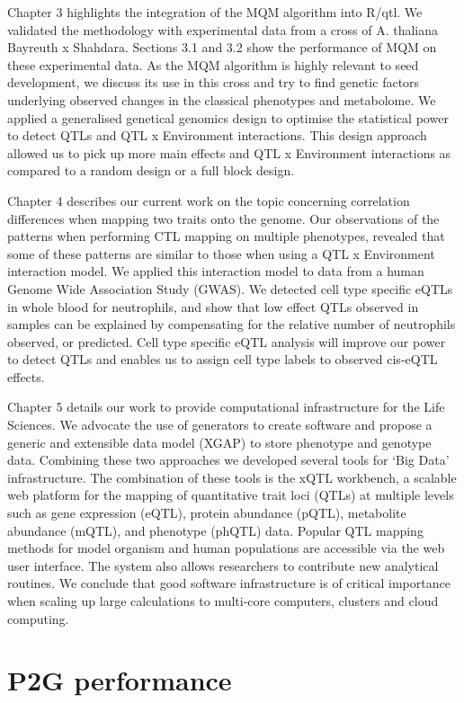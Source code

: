 Chapter 3 highlights the integration of the MQM algorithm into R/qtl. We validated the methodology with experimental data from a 
cross of A. thaliana Bayreuth x Shahdara. Sections 3.1 and 3.2 show the performance of MQM on these experimental data. As the MQM 
algorithm is highly relevant to seed development, we discuss its use in this cross and try to find genetic factors underlying 
observed changes in the classical phenotypes and metabolome. We applied a generalised genetical genomics design to optimise the 
statistical power to detect QTLs and QTL x Environment interactions. This design approach allowed us to pick up more main effects 
and QTL x Environment interactions as compared to a random design or a full block design.

Chapter 4 describes our current work on the topic concerning correlation differences when mapping two traits onto the genome. Our 
observations of the patterns when performing CTL mapping on multiple phenotypes, revealed that some of these patterns are similar 
to those when using a QTL x Environment interaction model. We applied this interaction model to data from a human Genome Wide 
Association Study (GWAS). We detected cell type specific eQTLs in whole blood for neutrophils, and show that low effect QTLs observed 
in samples can be explained by compensating for the relative number of neutrophils observed, or predicted. Cell type specific eQTL 
analysis will improve our power to detect QTLs and enables us to assign cell type labels to observed cis-eQTL effects.

Chapter 5 details our work to provide computational infrastructure for the Life Sciences. We advocate the use of generators to 
create software and propose a generic and extensible data model (XGAP) to store phenotype and genotype data. Combining these 
two approaches we developed several tools for ‘Big Data’ infrastructure. The combination of these tools is the xQTL workbench, 
a scalable web platform for the mapping of quantitative trait loci (QTLs) at multiple levels such as gene expression (eQTL), 
protein abundance (pQTL), metabolite abundance (mQTL), and phenotype (phQTL) data. Popular QTL mapping methods for model organism 
and human populations are accessible via the web user interface. The system also allows researchers to contribute new analytical 
routines. We conclude that good software infrastructure is of critical importance when scaling up large calculations to multi-core 
computers, clusters and cloud computing.

\section{P2G performance}


